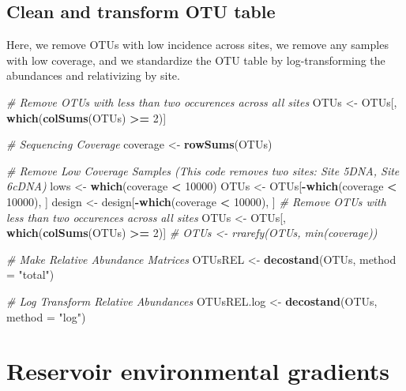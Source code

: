 \documentclass[]{article}
\newenvironment{Shaded}{\begin{snugshade}}{\end{snugshade}}
\newcommand{\KeywordTok}[1]{\textcolor[rgb]{0.13,0.29,0.53}{\textbf{#1}}}
\newcommand{\DataTypeTok}[1]{\textcolor[rgb]{0.13,0.29,0.53}{#1}}
\newcommand{\DecValTok}[1]{\textcolor[rgb]{0.00,0.00,0.81}{#1}}
\newcommand{\StringTok}[1]{\textcolor[rgb]{0.31,0.60,0.02}{#1}}
\newcommand{\CommentTok}[1]{\textcolor[rgb]{0.56,0.35,0.01}{\textit{#1}}}
\newcommand{\OperatorTok}[1]{\textcolor[rgb]{0.81,0.36,0.00}{\textbf{#1}}}
\newcommand{\NormalTok}[1]{#1}
\begin{document}
\subsection{Clean and transform OTU
table}\label{clean-and-transform-otu-table}

Here, we remove OTUs with low incidence across sites, we remove any
samples with low coverage, and we standardize the OTU table by
log-transforming the abundances and relativizing by site.

\begin{Shaded}
\begin{Highlighting}[]
\CommentTok{# Remove OTUs with less than two occurences across all sites}
\NormalTok{OTUs <-}\StringTok{ }\NormalTok{OTUs[, }\KeywordTok{which}\NormalTok{(}\KeywordTok{colSums}\NormalTok{(OTUs) }\OperatorTok{>=}\StringTok{ }\DecValTok{2}\NormalTok{)]}

\CommentTok{# Sequencing Coverage}
\NormalTok{coverage <-}\StringTok{ }\KeywordTok{rowSums}\NormalTok{(OTUs)}

\CommentTok{# Remove Low Coverage Samples (This code removes two sites: Site 5DNA, Site 6cDNA)}
\NormalTok{lows <-}\StringTok{ }\KeywordTok{which}\NormalTok{(coverage }\OperatorTok{<}\StringTok{ }\DecValTok{10000}\NormalTok{)}
\NormalTok{OTUs <-}\StringTok{ }\NormalTok{OTUs[}\OperatorTok{-}\KeywordTok{which}\NormalTok{(coverage }\OperatorTok{<}\StringTok{ }\DecValTok{10000}\NormalTok{), ]}
\NormalTok{design <-}\StringTok{ }\NormalTok{design[}\OperatorTok{-}\KeywordTok{which}\NormalTok{(coverage }\OperatorTok{<}\StringTok{ }\DecValTok{10000}\NormalTok{), ]}
\CommentTok{# Remove OTUs with less than two occurences across all sites}
\NormalTok{OTUs <-}\StringTok{ }\NormalTok{OTUs[, }\KeywordTok{which}\NormalTok{(}\KeywordTok{colSums}\NormalTok{(OTUs) }\OperatorTok{>=}\StringTok{ }\DecValTok{2}\NormalTok{)]}
\CommentTok{# OTUs <- rrarefy(OTUs, min(coverage))}

\CommentTok{# Make Relative Abundance Matrices}
\NormalTok{OTUsREL <-}\StringTok{ }\KeywordTok{decostand}\NormalTok{(OTUs, }\DataTypeTok{method =} \StringTok{"total"}\NormalTok{)}

\CommentTok{# Log Transform Relative Abundances}
\NormalTok{OTUsREL.log <-}\StringTok{ }\KeywordTok{decostand}\NormalTok{(OTUs, }\DataTypeTok{method =} \StringTok{"log"}\NormalTok{)}
\end{Highlighting}
\end{Shaded}

\section{Reservoir environmental
gradients}\label{reservoir-environmental-gradients}
\end{document}
